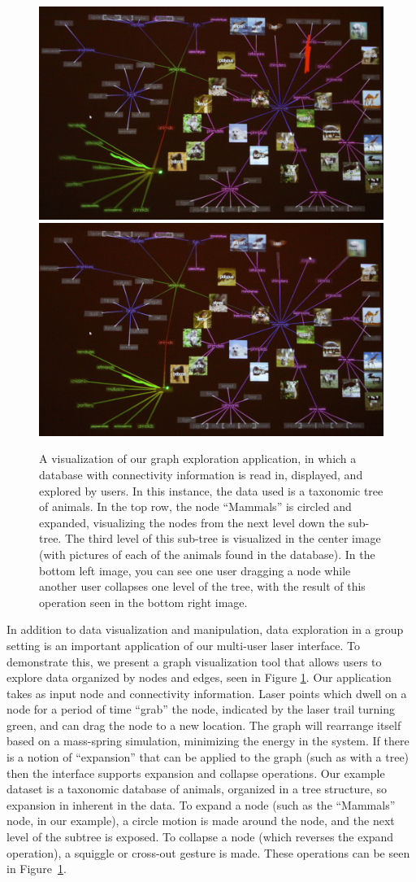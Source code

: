 \documentclass[review]{vgtc}                 %
\begin{document}
\begin{figure}[t]
\begin{center}
\begin{minipage}{0.99\linewidth}
    \includegraphics[width=0.49\linewidth]{images/graph4.jpg}
    \includegraphics[width=0.49\linewidth]{images/graph5.jpg}
  \end{minipage}  
  \end{center}
  \caption{\label{figure:graphVisualization} A visualization of our graph exploration application, in which a 
database with connectivity information is read in, displayed, and explored by users. In this instance, the data 
used is a taxonomic tree of animals. In the top row, the node ``Mammals'' is circled and expanded, visualizing 
the nodes from the next level down the sub-tree. The third level of this sub-tree is visualized in the center 
image (with pictures of each of the animals found in the database). In the bottom left image, you can see one 
user dragging a node while another user collapses one level of the tree, with the result of this operation seen 
in the bottom right image.}
\end{figure}

In addition to data visualization and manipulation, data exploration in a group setting is an important application 
of our multi-user laser interface. To demonstrate this, we present a graph visualization tool that allows users 
to explore data organized by nodes and edges, seen in Figure \ref{figure:graphVisualization}. Our application 
takes as input node and connectivity information. Laser points which dwell on a node for a period of time ``grab'' 
the node, indicated by the laser trail turning green, and can drag the node to a new location. The graph will 
rearrange itself based on a mass-spring simulation, minimizing the energy in the system. If there is a notion of 
``expansion'' that can be applied to the graph (such as with a tree) then the interface supports expansion and 
collapse operations. Our example dataset is a taxonomic database of animals, organized in a tree structure, so 
expansion in inherent in the data. To expand a node (such as the ``Mammals'' node, in our example), a circle 
motion is made around the node, and the next level of the subtree is exposed. To collapse a node (which reverses 
the expand operation), a squiggle or cross-out gesture is made. These operations can be seen in 
Figure~\ref{figure:graphVisualization}.
\end{document}
